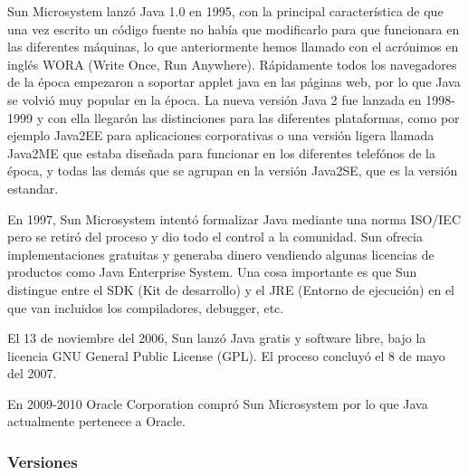 Sun Microsystem lanzó Java 1.0 en 1995, con la principal característica de que una vez escrito un código fuente no había que modificarlo para que funcionara en las diferentes máquinas, lo que anteriormente hemos llamado con el acrónimos en inglés WORA (Write Once, Run Anywhere). Rápidamente todos los navegadores de la época empezaron a soportar applet java en las páginas web, por lo que Java se volvió muy popular en la época. La nueva versión Java 2 fue lanzada en 1998-1999 y con ella llegarón las distinciones para las diferentes plataformas, como por ejemplo Java2EE para aplicaciones corporativas o una versión ligera llamada Java2ME que estaba diseñada para funcionar en los diferentes telefónos de la época, y todas las demás que se agrupan en la versión Java2SE, que es la versión estandar.

En 1997, Sun Microsystem intentó formalizar Java mediante una norma ISO/IEC pero se retiró del proceso y dio todo el control a la comunidad. Sun ofrecia implementaciones gratuitas y generaba dinero vendiendo algunas licencias de productos como Java Enterprise System. Una cosa importante es que Sun distingue entre el SDK (Kit de desarrollo) y el JRE (Entorno de ejecución) en el que van incluidos los compiladores, debugger, etc.

El 13 de noviembre del 2006, Sun lanzó Java gratis y software libre, bajo la licencia GNU General Public License (GPL). El proceso concluyó el 8 de mayo del 2007.

En 2009-2010 Oracle Corporation compró Sun Microsystem por lo que Java actualmente pertenece a Oracle.

\subsubsection{Versiones}

